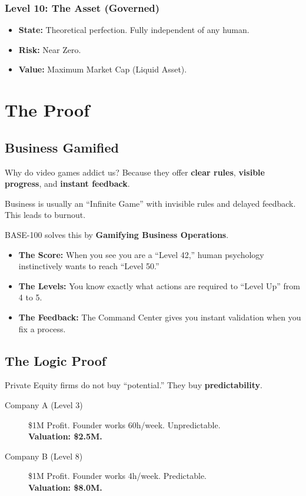 \documentclass[11pt, a4paper, oneside]{report}
\begin{document}
\subsection*{Level 10: The Asset (Governed)}
\begin{itemize}
    \item \textbf{State:} Theoretical perfection. Fully independent of any human.
    \item \textbf{Risk:} Near Zero.
    \item \textbf{Value:} Maximum Market Cap (Liquid Asset).
\end{itemize}

\chapter{The Proof}
\section*{Business Gamified}

Why do video games addict us? Because they offer \textbf{clear rules}, \textbf{visible progress}, and \textbf{instant feedback}.

Business is usually an ``Infinite Game'' with invisible rules and delayed feedback. This leads to burnout.

BASE-100 solves this by \textbf{Gamifying Business Operations}.
\begin{itemize}
    \item \textbf{The Score:} When you see you are a ``Level 42,'' human psychology instinctively wants to reach ``Level 50.''
    \item \textbf{The Levels:} You know exactly what actions are required to ``Level Up'' from 4 to 5.
    \item \textbf{The Feedback:} The Command Center gives you instant validation when you fix a process.
\end{itemize}

\section*{The Logic Proof}
Private Equity firms do not buy ``potential.'' They buy \textbf{predictability}.

\begin{description}
    \item[Company A (Level 3)] \$1M Profit. Founder works 60h/week. Unpredictable. \\ \textbf{Valuation: \$2.5M.}
    \item[Company B (Level 8)] \$1M Profit. Founder works 4h/week. Predictable. \\ \textbf{Valuation: \$8.0M.}
\end{description}
\end{document}
